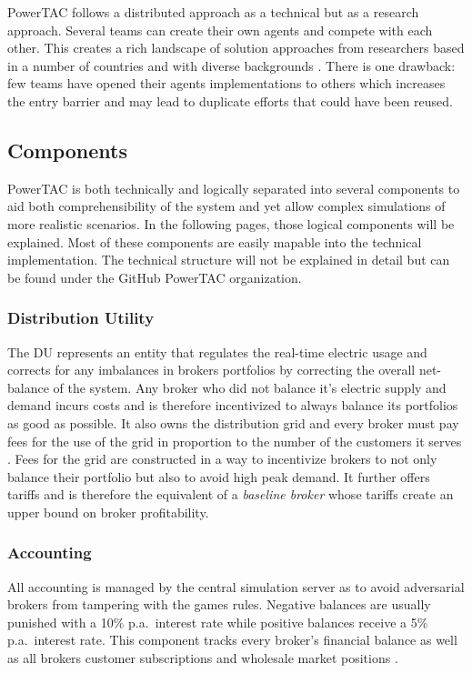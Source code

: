 \ac{PowerTAC} follows a distributed approach as a technical but as a research approach. Several teams can create their own
agents and compete with each other. This creates a rich landscape of solution approaches from researchers based in a
number of countries and with diverse backgrounds \cite[]{ketter2015competitive}. There is one drawback: few teams have opened
their agents implementations to others which increases the entry barrier and may lead to duplicate efforts that could
have been reused.

\subsection{Components}%
\label{sub:components}



\ac{PowerTAC} is both technically and logically separated into several components to aid both comprehensibility of the
system and yet allow complex simulations of more realistic scenarios. In the following pages, those logical components
will be explained. Most of these components are easily mapable into the technical implementation. The technical
structure will not be explained in detail but can be found under the GitHub \ac{PowerTAC} organization.


\subsubsection{Distribution Utility} The \ac{DU} represents an entity that regulates the real-time electric usage and
corrects for any imbalances in brokers portfolios by correcting the overall net-balance of the system. Any broker who
did not balance it's electric supply and demand incurs costs and is therefore incentivized to always balance its
portfolios as good as possible. It also owns the distribution grid and every broker must pay fees for the use of the
grid in proportion to the number of the customers it serves \citep[p.10]{ketter2018powertac}. Fees for the grid are
constructed in a way to incentivize brokers to not only balance their portfolio but also to avoid high peak demand.
It further offers tariffs and is therefore the equivalent of a \emph{baseline broker} whose tariffs create an upper bound on broker profitability.

\subsubsection{Accounting} All accounting is managed by the central simulation server as to avoid adversarial brokers
from tampering with the games rules. Negative balances are usually punished with a 10\% p.a.\ interest rate while
positive balances receive a 5\% p.a.\ interest rate. This component tracks every broker's financial balance as well as
all brokers customer subscriptions and wholesale market positions \citep[p.11]{ketter2018powertac}.

